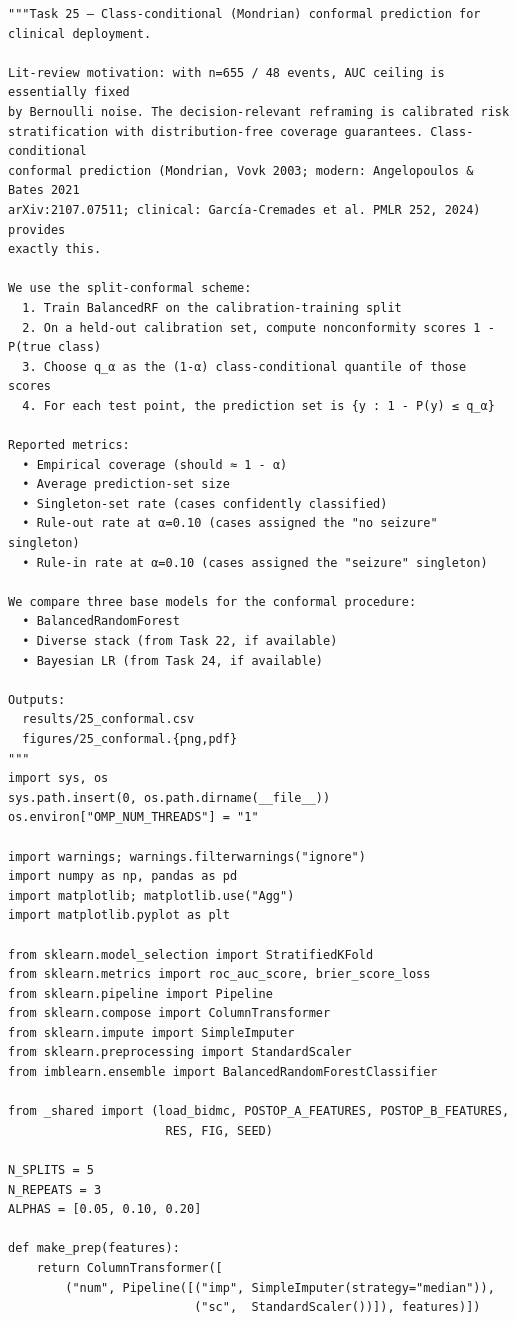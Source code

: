 \documentclass[11pt,a4paper]{article}
\begin{document}
\begin{lstlisting}[style=codeblock]
"""Task 25 — Class-conditional (Mondrian) conformal prediction for clinical deployment.

Lit-review motivation: with n=655 / 48 events, AUC ceiling is essentially fixed
by Bernoulli noise. The decision-relevant reframing is calibrated risk
stratification with distribution-free coverage guarantees. Class-conditional
conformal prediction (Mondrian, Vovk 2003; modern: Angelopoulos & Bates 2021
arXiv:2107.07511; clinical: García-Cremades et al. PMLR 252, 2024) provides
exactly this.

We use the split-conformal scheme:
  1. Train BalancedRF on the calibration-training split
  2. On a held-out calibration set, compute nonconformity scores 1 - P(true class)
  3. Choose q_α as the (1-α) class-conditional quantile of those scores
  4. For each test point, the prediction set is {y : 1 - P(y) ≤ q_α}

Reported metrics:
  • Empirical coverage (should ≈ 1 - α)
  • Average prediction-set size
  • Singleton-set rate (cases confidently classified)
  • Rule-out rate at α=0.10 (cases assigned the "no seizure" singleton)
  • Rule-in rate at α=0.10 (cases assigned the "seizure" singleton)

We compare three base models for the conformal procedure:
  • BalancedRandomForest
  • Diverse stack (from Task 22, if available)
  • Bayesian LR (from Task 24, if available)

Outputs:
  results/25_conformal.csv
  figures/25_conformal.{png,pdf}
"""
import sys, os
sys.path.insert(0, os.path.dirname(__file__))
os.environ["OMP_NUM_THREADS"] = "1"

import warnings; warnings.filterwarnings("ignore")
import numpy as np, pandas as pd
import matplotlib; matplotlib.use("Agg")
import matplotlib.pyplot as plt

from sklearn.model_selection import StratifiedKFold
from sklearn.metrics import roc_auc_score, brier_score_loss
from sklearn.pipeline import Pipeline
from sklearn.compose import ColumnTransformer
from sklearn.impute import SimpleImputer
from sklearn.preprocessing import StandardScaler
from imblearn.ensemble import BalancedRandomForestClassifier

from _shared import (load_bidmc, POSTOP_A_FEATURES, POSTOP_B_FEATURES,
                      RES, FIG, SEED)

N_SPLITS = 5
N_REPEATS = 3
ALPHAS = [0.05, 0.10, 0.20]

def make_prep(features):
    return ColumnTransformer([
        ("num", Pipeline([("imp", SimpleImputer(strategy="median")),
                          ("sc",  StandardScaler())]), features)])


\end{lstlisting}
\end{document}
